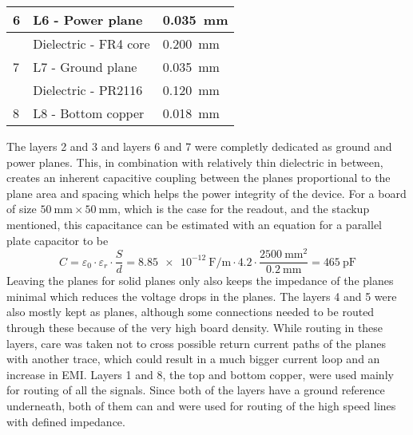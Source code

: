 \begin{table}[]
\begin{tabular}{|l|l|l|}
    6                                    & L6 - Power plane                   & \SI{0.035}{\milli\meter}                                   \\ \hline
                                         & Dielectric - FR4 core              & \SI{0.200}{\milli\meter}                                   \\ \hline
    7                                    & L7 - Ground plane                  & \SI{0.035}{\milli\meter}                                   \\ \hline
                                         & Dielectric - PR2116                & \SI{0.120}{\milli\meter}                                   \\ \hline
    8                                    & L8 - Bottom copper                 & \SI{0.018}{\milli\meter}                                   \\ \hline
    \end{tabular}
    \label{tab:stackup}
\end{table}
\FloatBarrier
The layers 2 and 3 and layers 6 and 7 were completly dedicated as ground and power planes. This, in combination with relatively thin dielectric in between, creates an inherent capacitive coupling between the planes proportional to the plane area and spacing which helps the power integrity of the device. For a board of size $\SI{50}{\milli\meter} \times \SI{50}{\milli\meter}$, which is the case for the readout, and the stackup mentioned, this capacitance can be estimated with an equation for a parallel plate capacitor to be
%
\begin{equation}
C = \varepsilon_0 \cdot \varepsilon_r \cdot \frac{S}{d} = \SI{8.85e-12}{\farad\per\meter} \cdot 4.2 \cdot \frac{\SI{2500}{\milli\meter\squared}}{\SI{0.2}{\milli\meter}} = \SI{465}{\pico\farad}
\end{equation}
%
Leaving the planes for solid planes only also keeps the impedance of the planes minimal which reduces the voltage drops in the planes. The layers 4 and 5 were also mostly kept as planes, although some connections needed to be routed through these because of the very high board density. While routing in these layers, care was taken not to cross possible return current paths of the planes with another trace, which could result in a much bigger current loop and an increase in EMI. Layers 1 and 8, the top and bottom copper, were used mainly for routing of all the signals. Since both of the layers have a ground reference underneath, both of them can and were used for routing of the high speed lines with defined impedance. 
%
